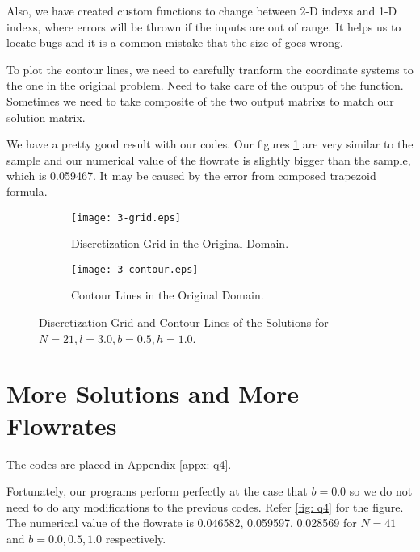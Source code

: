 \documentclass{assignment}[2019/10/15]
\begin{document}
    Also, we have created custom functions to change between 2-D indexs and 1-D indexs, where errors will be thrown if the inputs are out of range. It helps us to locate bugs and it is a common mistake that the size of  goes wrong.

    To plot the contour lines, we need to carefully tranform the coordinate systems to the one in the original problem. Need to take care of the output of the  function. Sometimes we need to take composite of the two output matrixs to match our solution matrix.

    We have a pretty good result with our codes. Our figures \ref{fig: q3} are very similar to the sample and our numerical value of the flowrate is slightly bigger than the sample, which is 0.059467. It may be caused by the error from composed trapezoid formula.

    \begin{figure}[htb]
        \begin{subfigure}[b]{0.49\textwidth}
            \centering
            \texttt{[image: 3-grid.eps]}
            \caption{Discretization Grid in the Original Domain.}
        \end{subfigure}
        \hfill
        \begin{subfigure}[b]{0.49\textwidth}
            \centering
            \texttt{[image: 3-contour.eps]}
            \caption{Contour Lines in the Original Domain.}
        \end{subfigure}
        \caption{Discretization Grid and Contour Lines of the Solutions for $N = 21, l = 3.0, b = 0.5, h = 1.0$.}
        \label{fig: q3}
    \end{figure}

    \section{More Solutions and More Flowrates}

    The codes are placed in Appendix \ref{appx: q4}.

    Fortunately, our programs perform perfectly at the case that $b = 0.0$ so we do not need to do any modifications to the previous codes. Refer \ref{fig: q4} for the figure. The numerical value of the flowrate is 0.046582, 0.059597, 0.028569 for $N = 41$ and $b = 0.0, 0.5, 1.0$ respectively.
\end{document}
